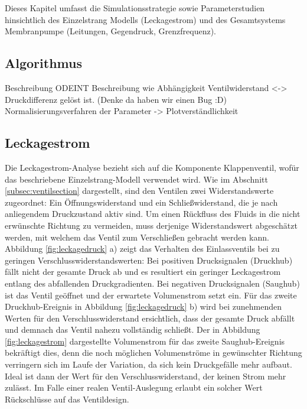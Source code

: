 \documentclass[fontsize=12pt, a4paper]{scrartcl}
\begin{document}
Dieses Kapitel umfasst die Simulationsstrategie sowie Parameterstudien hinsichtlich des Einzelstrang Modells (Leckagestrom) und des Gesamtsystems Membranpumpe (Leitungen, Gegendruck, Grenzfrequenz).

\subsection{Algorithmus}

Beschreibung ODEINT
Beschreibung wie Abhängigkeit Ventilwiderstand <-> Druckdifferenz gelöst ist. (Denke da haben wir einen Bug :D)
Normalisierungsverfahren der Parameter -> Plotverständlichkeit

\subsection{Leckagestrom}

Die Leckagestrom-Analyse bezieht sich auf die Komponente Klappenventil, wofür das beschriebene Einzelstrang-Modell verwendet wird. Wie im Abschnitt \ref{subsec:ventilsection} dargestellt, sind den Ventilen zwei Widerstandswerte zugeordnet: Ein Öffnungswiderstand und ein Schließwiderstand, die je nach anliegendem Druckzustand aktiv sind. Um einen Rückfluss des Fluids in die nicht erwünschte Richtung zu vermeiden, muss derjenige Widerstandswert abgeschätzt werden, mit welchem das Ventil zum Verschließen gebracht werden kann. Abbildung \ref{fig:leckagedruck} a) zeigt das Verhalten des Einlassventils bei zu geringen Verschlusswiderstandswerten: Bei positiven Drucksignalen (Druckhub) fällt nicht der gesamte Druck ab und es resultiert ein geringer Leckagestrom entlang des abfallenden Druckgradienten. Bei negativen Drucksignalen (Saughub) ist das Ventil geöffnet und der erwartete Volumenstrom setzt ein. Für das zweite Druckhub-Ereignis in Abbildung \ref{fig:leckagedruck} b) wird bei zunehmenden Werten für den Verschlusswiderstand ersichtlich, dass der gesamte Druck abfällt und demnach das Ventil nahezu vollständig schließt. Der in  Abbildung \ref{fig:leckagestrom} dargestellte Volumenstrom für das zweite Saughub-Ereignis bekräftigt dies, denn die noch möglichen Volumenströme in gewünschter Richtung verringern sich im Laufe der Variation, da sich kein Druckgefälle mehr aufbaut. Ideal ist dann der Wert für den Verschlusswiderstand, der keinen Strom mehr zulässt. Im Falle einer realen Ventil-Auslegung erlaubt ein solcher Wert Rückschlüsse auf das Ventildesign.
\end{document}
